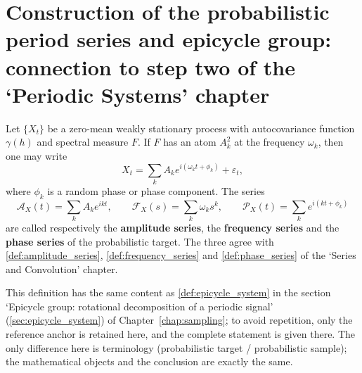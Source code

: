 \section{Construction of the probabilistic period series and epicycle group: connection to step two of the `Periodic Systems' chapter}
\label{sec:prob_series_construction}

\begin{definition}\label{def:prob_series}
Let $\{X_t\}$ be a zero-mean weakly stationary process with autocovariance function $\gamma(h)$ and spectral measure $F$. If $F$ has an atom $A_k^2$ at the frequency $\omega_k$, then one may write
\[
X_t=\sum_k A_k e^{i(\omega_k t+\phi_k)}+\varepsilon_t,
\]
where $\phi_k$ is a random phase or phase component. The series
\[
\mathcal A_X(t)=\sum_k A_k e^{ikt},\qquad
\mathcal F_X(s)=\sum_k \omega_k s^k,\qquad
\mathcal P_X(t)=\sum_k e^{i(kt+\phi_k)}
\]
are called respectively the \textbf{amplitude series}, the \textbf{frequency series} and the \textbf{phase series} of the probabilistic target. The three agree with \cref{def:amplitude_series}, \cref{def:frequency_series} and \cref{def:phase_series} of the `Series and Convolution' chapter.
\end{definition}

\begin{definition}\label{def:prob_epicycle_group}
This definition has the same content as \cref{def:epicycle_system} in the section `Epicycle group: rotational decomposition of a periodic signal' (\cref{sec:epicycle_system}) of Chapter~\ref{chap:sampling}; to avoid repetition, only the reference anchor is retained here, and the complete statement is given there. The only difference here is terminology (probabilistic target / probabilistic sample); the mathematical objects and the conclusion are exactly the same.
\end{definition}

